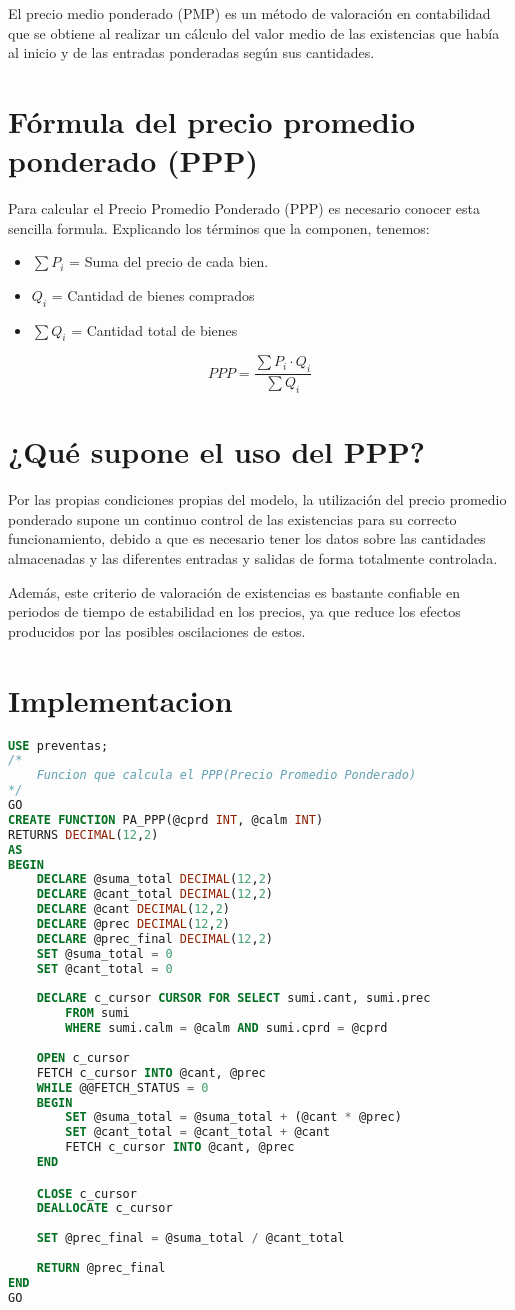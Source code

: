 El precio medio ponderado (PMP) es un método de valoración en contabilidad que se obtiene al realizar un cálculo del valor medio de las existencias que había al inicio y de las entradas ponderadas según sus cantidades.

\section*{Fórmula del precio promedio ponderado (PPP)}

Para calcular el Precio Promedio Ponderado (PPP) es necesario conocer esta sencilla formula. Explicando los términos que la componen, tenemos:
\begin{itemize}
\item $\sum P_i$ = Suma del precio de cada bien.
\item $Q_i$ = Cantidad de bienes comprados
\item $\sum Q_i$ = Cantidad total de bienes
\end{itemize}
$$
	PPP = \dfrac{\sum P_i \cdot Q_i}{\sum Q_i}
$$
\section*{¿Qué supone el uso del PPP?}

Por las propias condiciones propias del modelo, la utilización del precio promedio ponderado supone un continuo control de las existencias para su correcto funcionamiento, debido a que es necesario tener los datos sobre las cantidades almacenadas y las diferentes entradas y salidas de forma totalmente controlada.

Además, este criterio de valoración de existencias es bastante confiable en periodos de tiempo de estabilidad en los precios, ya que reduce los efectos producidos por las posibles oscilaciones de estos.

\pagebreak
\section*{Implementacion}
\begin{lstlisting}[language=SQL]
USE preventas;
/*
	Funcion que calcula el PPP(Precio Promedio Ponderado)
*/
GO
CREATE FUNCTION PA_PPP(@cprd INT, @calm INT)
RETURNS DECIMAL(12,2)
AS
BEGIN
	DECLARE @suma_total DECIMAL(12,2)
	DECLARE @cant_total DECIMAL(12,2)
	DECLARE @cant DECIMAL(12,2)
	DECLARE @prec DECIMAL(12,2)
	DECLARE @prec_final DECIMAL(12,2)
	SET @suma_total = 0
	SET @cant_total = 0
	
	DECLARE c_cursor CURSOR FOR SELECT sumi.cant, sumi.prec
		FROM sumi
		WHERE sumi.calm = @calm AND sumi.cprd = @cprd
	
	OPEN c_cursor
	FETCH c_cursor INTO @cant, @prec
	WHILE @@FETCH_STATUS = 0
	BEGIN
		SET @suma_total = @suma_total + (@cant * @prec)
		SET @cant_total = @cant_total + @cant
		FETCH c_cursor INTO @cant, @prec
	END

	CLOSE c_cursor
	DEALLOCATE c_cursor
	
	SET @prec_final = @suma_total / @cant_total
	
	RETURN @prec_final
END
GO

\end{lstlisting}